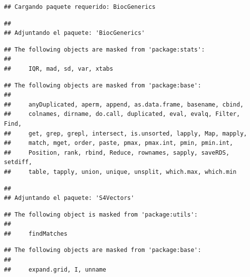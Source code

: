 \documentclass[
]{article}
\newenvironment{Shaded}{\begin{snugshade}}{\end{snugshade}}
\newcommand{\AttributeTok}[1]{\textcolor[rgb]{0.13,0.29,0.53}{#1}}
\newcommand{\FunctionTok}[1]{\textcolor[rgb]{0.13,0.29,0.53}{\textbf{#1}}}
\newcommand{\NormalTok}[1]{#1}
\newcommand{\OtherTok}[1]{\textcolor[rgb]{0.56,0.35,0.01}{#1}}
\newcommand{\SpecialCharTok}[1]{\textcolor[rgb]{0.81,0.36,0.00}{\textbf{#1}}}
\begin{document}
\begin{verbatim}
## Cargando paquete requerido: BiocGenerics
\end{verbatim}

\begin{verbatim}
## 
## Adjuntando el paquete: 'BiocGenerics'
\end{verbatim}

\begin{verbatim}
## The following objects are masked from 'package:stats':
## 
##     IQR, mad, sd, var, xtabs
\end{verbatim}

\begin{verbatim}
## The following objects are masked from 'package:base':
## 
##     anyDuplicated, aperm, append, as.data.frame, basename, cbind,
##     colnames, dirname, do.call, duplicated, eval, evalq, Filter, Find,
##     get, grep, grepl, intersect, is.unsorted, lapply, Map, mapply,
##     match, mget, order, paste, pmax, pmax.int, pmin, pmin.int,
##     Position, rank, rbind, Reduce, rownames, sapply, saveRDS, setdiff,
##     table, tapply, union, unique, unsplit, which.max, which.min
\end{verbatim}

\begin{verbatim}
## 
## Adjuntando el paquete: 'S4Vectors'
\end{verbatim}

\begin{verbatim}
## The following object is masked from 'package:utils':
## 
##     findMatches
\end{verbatim}

\begin{verbatim}
## The following objects are masked from 'package:base':
## 
##     expand.grid, I, unname
\end{verbatim}

\begin{Shaded}
\end{Shaded}
\end{document}
